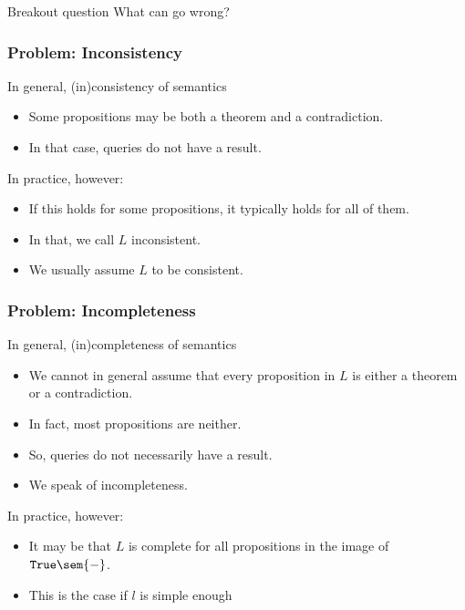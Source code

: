 \begin{frame}{Breakout question}
What can go wrong?
\end{frame}

\begin{frame}\frametitle{Problem: Inconsistency}
In general, (in)consistency of semantics
\begin{itemize}
\item Some propositions may be both a theorem and a contradiction.
\item In that case, queries do not have a result.
\end{itemize}

In practice, however:
\begin{itemize}
\item If this holds for some propositions, it typically holds for all of them.
\item In that, we call $L$ inconsistent.
\item We usually assume $L$ to be consistent.
\end{itemize}
\end{frame}


\begin{frame}\frametitle{Problem: Incompleteness}
In general, (in)completeness of semantics
\begin{itemize}
\item We cannot in general assume that every proposition in $L$ is either a theorem or a contradiction.
\item In fact, most propositions are neither.
\item So, queries do not necessarily have a result.
\item We speak of incompleteness. 
\end{itemize}

In practice, however:
\begin{itemize}
\item It may be that $L$ is complete for all propositions in the image of $\truelift\sem{-}$.
\item This is the case if $l$ is simple enough 
\end{itemize}
\end{frame}

